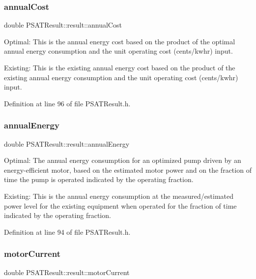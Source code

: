 \subsubsection{\texorpdfstring{annual\+Cost}{annualCost}}
{\footnotesize\ttfamily double P\+S\+A\+T\+Result\+::result\+::annual\+Cost}



Optimal\+: This is the annual energy cost based on the product of the optimal annual energy consumption and the unit operating cost (cents/kwhr) input. 

Existing\+: This is the existing annual energy cost based on the product of the existing annual energy consumption and the unit operating cost (cents/kwhr) input. 

Definition at line 96 of file P\+S\+A\+T\+Result.\+h.

\mbox{\label{struct_p_s_a_t_result_1_1result_a0aeab028f0a7cf0ae1cc968161be4a97}} 
\subsubsection{\texorpdfstring{annual\+Energy}{annualEnergy}}
{\footnotesize\ttfamily double P\+S\+A\+T\+Result\+::result\+::annual\+Energy}



Optimal\+: The annual energy consumption for an optimized pump driven by an energy-\/efficient motor, based on the estimated motor power and on the fraction of time the pump is operated indicated by the operating fraction. 

Existing\+: This is the annual energy consumption at the measured/estimated power level for the existing equipment when operated for the fraction of time indicated by the operating fraction. 

Definition at line 94 of file P\+S\+A\+T\+Result.\+h.

\mbox{\label{struct_p_s_a_t_result_1_1result_a1383694c94d04084421e0bd3f3c72af7}} 
\subsubsection{\texorpdfstring{motor\+Current}{motorCurrent}}
{\footnotesize\ttfamily double P\+S\+A\+T\+Result\+::result\+::motor\+Current}



